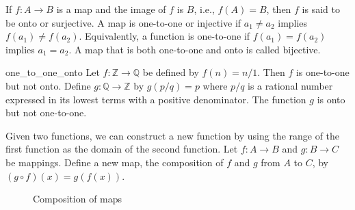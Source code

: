 If $f:A \rightarrow B$ is a map and the image of $f$ is $B$, i.e., $f(A) = B$, then $f$ is said to be {\bfi onto\/} or {\bfi surjective}.  A map is {\bfi one-to-one\/} or {\bfi injective\/} if $a_1 \neq a_2$ implies $f(a_1) \neq f(a_2)$.  Equivalently, a function is one-to-one if $f(a_1) = f(a_2)$ implies $a_1 = a_2$.  A map that is both one-to-one and onto is called {\bfi bijective}.

\begin{example}{one_to_one_onto}
Let $f:{\mathbb Z} \rightarrow {\mathbb Q}$ be defined by $f(n) = n/1$.  Then $f$ is one-to-one but not onto.  Define $g : {\mathbb Q} \rightarrow {\mathbb Z}$ by $g(p/q) = p$ where $p/q$ is a rational number expressed in its lowest terms with a positive denominator.  The function $g$ is onto but not one-to-one. 
\end{example}

Given two functions, we can construct a new function by using the range of the first function as the domain of the second function.  Let $f : A \rightarrow B$ and $g : B \rightarrow C$ be mappings.  Define a new map, the {\bfi composition\/} of $f$ and $g$ from $A$ to $C$, by $(g \circ f)(x) = g(f(x))$.

\begin{figure}[htb] %
\begin{center}

\caption{Composition of maps} \label{sets_figure_composition}

\end{center}
\end{figure}

